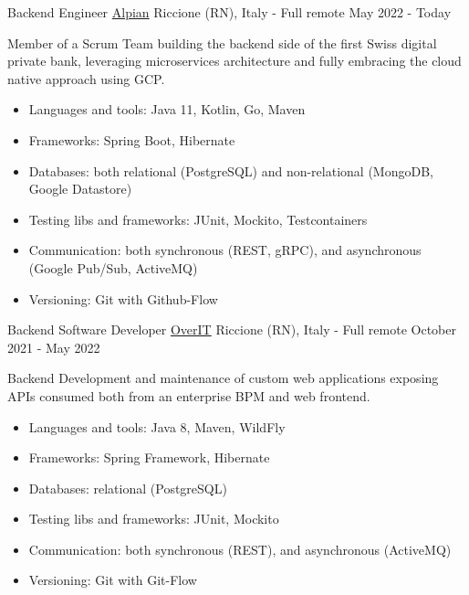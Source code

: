 

\begin{cventries}
	
\cventry
{Backend Engineer} %
{\href{https://alpian.com/}{Alpian}} %
{Riccione (RN), Italy - Full remote} %
{May 2022 - Today} %
{
	Member of a Scrum Team building the backend side of the first Swiss digital private bank, leveraging microservices architecture and fully embracing the cloud native approach using GCP.
	\begin{itemize}
		\item {Languages and tools: Java 11, Kotlin, Go, Maven}
		\item {Frameworks: Spring Boot, Hibernate}
		\item {Databases: both relational (PostgreSQL) and non-relational (MongoDB, Google Datastore)}
		\item {Testing libs and frameworks: JUnit, Mockito, Testcontainers}
		\item {Communication: both synchronous (REST, gRPC), and asynchronous (Google Pub/Sub, ActiveMQ)}
		\item {Versioning: Git with Github-Flow}
	\end{itemize}
}


\cventry
	{Backend Software Developer} %
	{\href{https://overit.it/en}{OverIT}} %
	{Riccione (RN), Italy - Full remote} %
	{October 2021 - May 2022} %
	{
		Backend Development and maintenance of custom web applications exposing APIs consumed both from an enterprise BPM and web frontend.
		\begin{itemize}
			\item {Languages and tools: Java 8, Maven, WildFly}
			\item {Frameworks: Spring Framework, Hibernate}
			\item {Databases: relational (PostgreSQL)}
			\item {Testing libs and frameworks: JUnit, Mockito}
			\item {Communication: both synchronous (REST), and asynchronous (ActiveMQ)}
			\item {Versioning: Git with Git-Flow}
		\end{itemize}
	}


\end{cventries}
